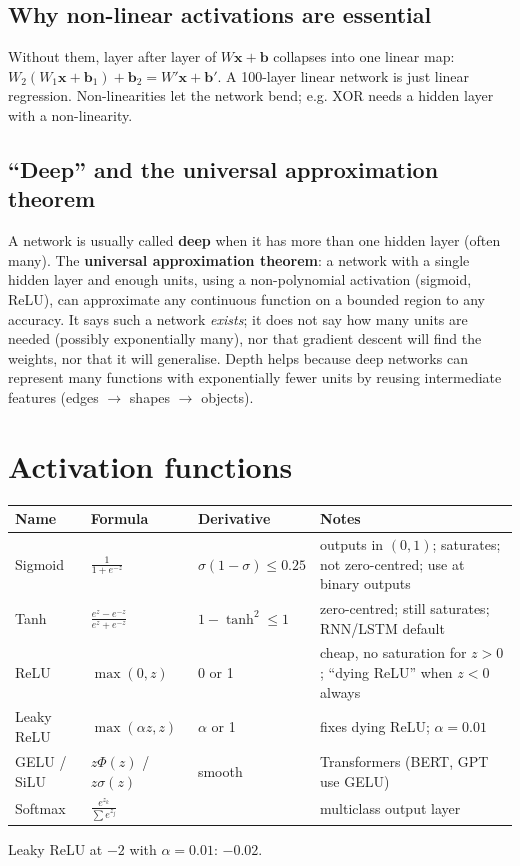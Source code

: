 \subsection{Why non-linear activations are essential}
Without them, layer after layer of $W\mathbf x + \mathbf b$ collapses into one linear map: $W_2(W_1\mathbf x + \mathbf b_1) + \mathbf b_2 = W'\mathbf x + \mathbf b'$.
A 100-layer linear network is just linear regression. Non-linearities let the network bend; e.g. XOR needs a hidden layer with a non-linearity.

\subsection{``Deep'' and the universal approximation theorem}
A network is usually called \textbf{deep} when it has more than one hidden layer (often many). The \textbf{universal approximation theorem}: a network with
a single hidden layer and enough units, using a non-polynomial activation (sigmoid, ReLU), can approximate any continuous function on a bounded region
to any accuracy. It says such a network \emph{exists}; it does not say how many units are needed (possibly exponentially many), nor that gradient descent will
find the weights, nor that it will generalise. Depth helps because deep networks can represent many functions with exponentially fewer units by reusing
intermediate features (edges $\to$ shapes $\to$ objects).

\section{Activation functions}
\begin{center}\small
\begin{tabularx}{\linewidth}{l l l X}
\toprule
Name & Formula & Derivative & Notes\\
\midrule
Sigmoid & $\frac{1}{1 + e^{-z}}$ & $\sigma(1-\sigma)\le0.25$ & outputs in $(0,1)$; saturates; not zero-centred; use at binary outputs\\
Tanh & $\frac{e^z - e^{-z}}{e^z + e^{-z}}$ & $1 - \tanh^2\le1$ & zero-centred; still saturates; RNN/LSTM default\\
ReLU & $\max(0, z)$ & 0 or 1 & cheap, no saturation for $z>0$; ``dying ReLU'' when $z<0$ always\\
Leaky ReLU & $\max(\alpha z, z)$ & $\alpha$ or 1 & fixes dying ReLU; $\alpha = 0.01$\\
GELU / SiLU & $z\Phi(z)$ / $z\sigma(z)$ & smooth & Transformers (BERT, GPT use GELU)\\
Softmax & $\frac{e^{z_k}}{\sum e^{z_j}}$ & & multiclass output layer\\
\bottomrule
\end{tabularx}
\end{center}
Leaky ReLU at $-2$ with $\alpha = 0.01$: $-0.02$.

